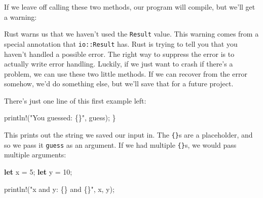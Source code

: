 \documentclass[a4paper,]{book}
\newenvironment{Shaded}{\begin{snugshade}}{\end{snugshade}}
\newcommand{\KeywordTok}[1]{\textcolor[rgb]{0.13,0.29,0.53}{\textbf{{#1}}}}
\newcommand{\DecValTok}[1]{\textcolor[rgb]{0.00,0.00,0.81}{{#1}}}
\newcommand{\StringTok}[1]{\textcolor[rgb]{0.31,0.60,0.02}{{#1}}}
\newcommand{\CommentTok}[1]{\textcolor[rgb]{0.56,0.35,0.01}{\textit{{#1}}}}
\newcommand{\OtherTok}[1]{\textcolor[rgb]{0.56,0.35,0.01}{{#1}}}
\newcommand{\NormalTok}[1]{{#1}}
\begin{document}
If we leave off calling these two methods, our program will compile, but
we'll get a warning:

\begin{Shaded}
\end{Shaded}

Rust warns us that we haven't used the \texttt{Result} value. This
warning comes from a special annotation that \texttt{io::Result} has.
Rust is trying to tell you that you haven't handled a possible error.
The right way to suppress the error is to actually write error handling.
Luckily, if we just want to crash if there's a problem, we can use these
two little methods. If we can recover from the error somehow, we'd do
something else, but we'll save that for a future project.

There's just one line of this first example left:

\begin{Shaded}
\begin{Highlighting}[]
    \OtherTok{println!}\NormalTok{(}\StringTok{"You guessed: \{\}"}\NormalTok{, guess);}
\NormalTok{\}}
\end{Highlighting}
\end{Shaded}

This prints out the string we saved our input in. The \texttt{\{\}}s are
a placeholder, and so we pass it \texttt{guess} as an argument. If we
had multiple \texttt{\{\}}s, we would pass multiple arguments:

\begin{Shaded}
\begin{Highlighting}[]
\KeywordTok{let} \NormalTok{x = }\DecValTok{5}\NormalTok{;}
\KeywordTok{let} \NormalTok{y = }\DecValTok{10}\NormalTok{;}

\OtherTok{println!}\NormalTok{(}\StringTok{"x and y: \{\} and \{\}"}\NormalTok{, x, y);}
\end{Highlighting}
\end{Shaded}
\end{document}
